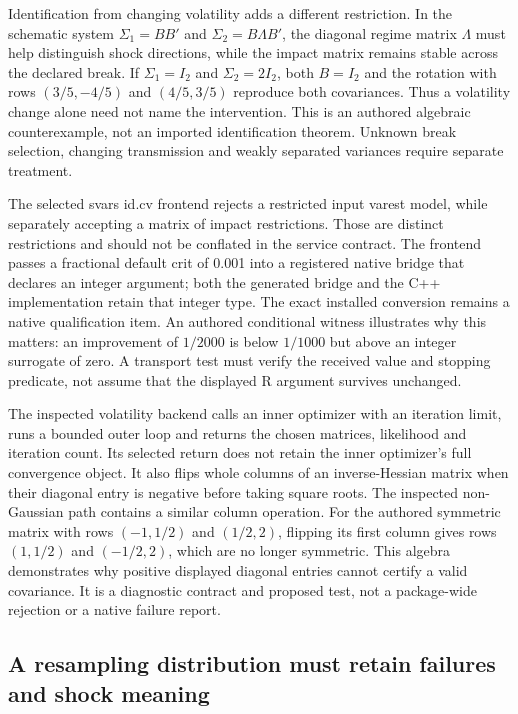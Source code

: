 Identification from changing volatility adds a different restriction. In the schematic system $\Sigma_1=BB'$ and $\Sigma_2=B\Lambda B'$, the diagonal regime matrix $\Lambda$ must help distinguish shock directions, while the impact matrix remains stable across the declared break. If $\Sigma_1=I_2$ and $\Sigma_2=2I_2$, both $B=I_2$ and the rotation with rows $(3/5,-4/5)$ and $(4/5,3/5)$ reproduce both covariances. Thus a volatility change alone need not name the intervention. This is an authored algebraic counterexample, not an imported identification theorem. Unknown break selection, changing transmission and weakly separated variances require separate treatment.~\citep{exec25_rdyn_choice}

The selected svars id.cv frontend rejects a restricted input varest model, while separately accepting a matrix of impact restrictions. Those are distinct restrictions and should not be conflated in the service contract. The frontend passes a fractional default crit of 0.001 into a registered native bridge that declares an integer argument; both the generated bridge and the C++ implementation retain that integer type. The exact installed conversion remains a native qualification item. An authored conditional witness illustrates why this matters: an improvement of $1/2000$ is below $1/1000$ but above an integer surrogate of zero. A transport test must verify the received value and stopping predicate, not assume that the displayed R argument survives unchanged.~\citep{exec25_rdyn_svars,exec25_rdyn_choice}

The inspected volatility backend calls an inner optimizer with an iteration limit, runs a bounded outer loop and returns the chosen matrices, likelihood and iteration count. Its selected return does not retain the inner optimizer's full convergence object. It also flips whole columns of an inverse-Hessian matrix when their diagonal entry is negative before taking square roots. The inspected non-Gaussian path contains a similar column operation. For the authored symmetric matrix with rows $(-1,1/2)$ and $(1/2,2)$, flipping its first column gives rows $(1,1/2)$ and $(-1/2,2)$, which are no longer symmetric. This algebra demonstrates why positive displayed diagonal entries cannot certify a valid covariance. It is a diagnostic contract and proposed test, not a package-wide rejection or a native failure report.~\citep{exec25_rdyn_svars,exec25_rdyn_choice}

\subsection{A resampling distribution must retain failures and shock meaning}

